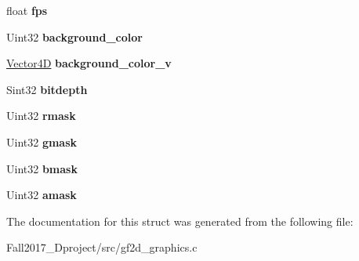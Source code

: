 \begin{DoxyCompactItemize}
float {\bfseries fps}
\item 
\mbox{\label{struct_graphics_ae1a2c84bb5fab92239b98f2ee5d7b72d}} 
Uint32 {\bfseries background\+\_\+color}
\item 
\mbox{\label{struct_graphics_af80b492818c20f805c4067a6a1b2c750}} 
\hyperlink{struct_vector4_d}{Vector4D} {\bfseries background\+\_\+color\+\_\+v}
\item 
\mbox{\label{struct_graphics_a433154291df15ef1463eda4941fa2fba}} 
Sint32 {\bfseries bitdepth}
\item 
\mbox{\label{struct_graphics_a05b5255942e441c4fa513bef0289e4cc}} 
Uint32 {\bfseries rmask}
\item 
\mbox{\label{struct_graphics_a43613889bd9d644775e8da9db3a32375}} 
Uint32 {\bfseries gmask}
\item 
\mbox{\label{struct_graphics_a14b0866344628e753ba7670a11b780b4}} 
Uint32 {\bfseries bmask}
\item 
\mbox{\label{struct_graphics_ab8c1e3f1165d8eaaef52fe2bcbb06726}} 
Uint32 {\bfseries amask}
\end{DoxyCompactItemize}


The documentation for this struct was generated from the following file\+:\begin{DoxyCompactItemize}
\item 
Fall2017\+\_\+Dproject/src/gf2d\+\_\+graphics.\+c\end{DoxyCompactItemize}
